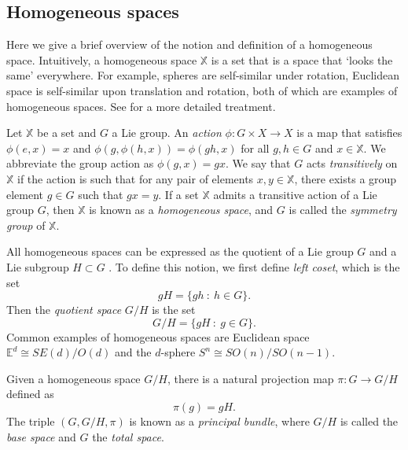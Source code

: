 
\subsection{Homogeneous spaces}

Here we give a brief overview of the notion and definition of a homogeneous space. Intuitively, a homogeneous space $\mathbb{X}$ is a set that is a space that `looks the same' everywhere. For example, spheres are self-similar under rotation, Euclidean space is self-similar upon translation and rotation, both of which are examples of homogeneous spaces. See \citep{clellandFrenetCartanMethod2017, schwichtenbergPhysicsSymmetry2017} for a more detailed treatment.

Let $\mathbb{X}$ be a set and $G$ a Lie group. An \textit{action} $\phi : G \times X \to X$ is a map that satisfies $\phi(e, x) = x$ and $\phi(g, \phi(h, x)) = \phi(g h, x)$ for all $g,h \in G$ and $x \in \mathbb{X}$. We abbreviate the group action as $\phi(g, x) = g x$. We say that $G$ acts \textit{transitively} on $\mathbb{X}$ if the action is such that for any pair of elements $x,y \in \mathbb{X}$, there exists a group element $g \in G$ such that $g x = y$. If a set $\mathbb{X}$ admits a transitive action of a Lie group $G$, then $\mathbb{X}$ is known as a \textit{homogeneous space}, and $G$ is called the \textit{symmetry group} of $\mathbb{X}$.

All homogeneous spaces can be expressed as the quotient of a Lie group $G$ and a Lie subgroup $H \subset G$ \citep{kobayashiFoundationsDifferentialGeometry1996}. To define this notion, we first define \textit{left coset}, which is the set
\begin{equation}
	gH = \{ gh\ :\ h \in G \}.
\end{equation}
Then the \textit{quotient space} $G/H$ is the set
\begin{equation}
	G / H = \{ gH\ :\ g \in G \}.
\end{equation}
Common examples of homogeneous spaces are Euclidean space $\mathbb{E}^d \cong SE(d) / O(d)$ and the $d$-sphere $S^n \cong SO(n) / SO(n-1)$.

Given a homogeneous space $G/H$, there is a natural projection map $\pi : G \to G/H$ defined as
\begin{equation}
\pi(g) = gH.
\end{equation}
The triple $(G, G/H, \pi)$ is known as a \textit{principal bundle}, where $G/H$ is called the \textit{base space} and $G$ the \textit{total space}.

